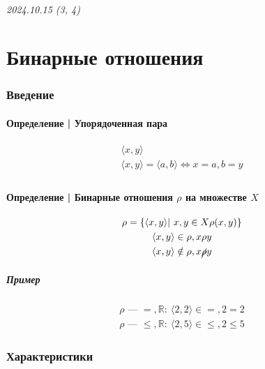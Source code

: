 \documentclass{article}
\begin{document}
\newpage
\paragraph{2024.10.15 (3, 4)}
\part{Бинарные отношения}

\section{Введение}

\subsection{Определение | Упорядоченная пара}
\begin{gather*}
    \langle x, y \rangle \\
    \langle x, y \rangle = \langle a, b \rangle \Leftrightarrow x = a, b = y \\
\end{gather*}


\subsection{Определение | Бинарные отношения $\rho$ на множестве $X$}
\begin{gather*}
    \rho = \{\langle x, y \rangle | ~x, y \in X \rho(x, y)\} \\
    \langle x, y \rangle \in \rho, x \rho y \\
    \langle x, y \rangle \notin \rho, x \cancel{\rho} y
\end{gather*}

\subsubsection{Пример}
\begin{gather*}
    \rho \text{ --- } =, \mathbb{R}:~ \langle 2, 2 \rangle \in =, 2 = 2 \\
    \rho \text{ --- } \le, \mathbb{R}:~ \langle 2, 5 \rangle \in \le, 2 \le 5
\end{gather*}



\section{Характеристики}
\end{document}
